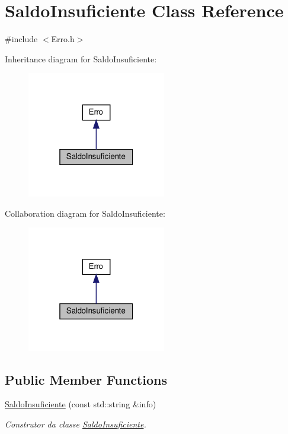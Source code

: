 \hypertarget{classSaldoInsuficiente}{}\section{Saldo\+Insuficiente Class Reference}
\label{classSaldoInsuficiente}


{\ttfamily \#include $<$Erro.\+h$>$}



Inheritance diagram for Saldo\+Insuficiente\+:
\nopagebreak
\begin{figure}[H]
\begin{center}
\leavevmode
\includegraphics[width=172pt]{classSaldoInsuficiente__inherit__graph}
\end{center}
\end{figure}


Collaboration diagram for Saldo\+Insuficiente\+:
\nopagebreak
\begin{figure}[H]
\begin{center}
\leavevmode
\includegraphics[width=172pt]{classSaldoInsuficiente__coll__graph}
\end{center}
\end{figure}
\subsection*{Public Member Functions}
\begin{DoxyCompactItemize}
\item 
\hyperlink{classSaldoInsuficiente_aacd4d88be6fe190105bf122355d72df4}{Saldo\+Insuficiente} (const std\+::string \&info)
\begin{DoxyCompactList}\small\item\em Construtor da classe \hyperlink{classSaldoInsuficiente}{Saldo\+Insuficiente}. \end{DoxyCompactList}\end{DoxyCompactItemize}



